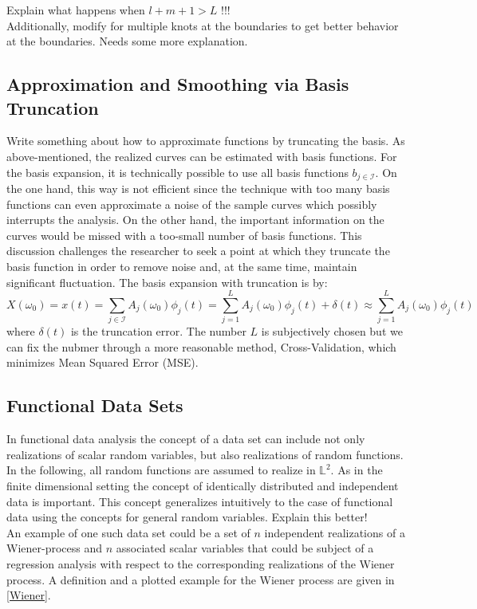 \documentclass[11pt,twoside,a4paper]{article}
\begin{document}
	{\color{red}Explain what happens when $l+m+1 > L$ !!!\\
		Additionally, modify for multiple knots at the boundaries to get better behavior at the boundaries. Needs some more explanation.}	
	
	\subsection{Approximation and Smoothing via Basis Truncation}
	{\color{red} Write something about how to approximate functions by truncating the basis.}
	As above-mentioned, the realized curves can be estimated with basis functions. For the basis expansion, it is technically possible to use all basis functions $b_{j \in \mathcal{I}}$. On the one hand, this way is not efficient since the technique with too many basis functions can even approximate a noise of the sample curves which possibly interrupts the analysis. On the other hand, the important information on the curves would be missed with a too-small number of basis functions. This discussion challenges the researcher to seek a point at which they truncate the basis function in order to remove noise and, at the same time, maintain significant fluctuation. The basis expansion with truncation is by:
	\begin{equation}
		X(\omega_0) = x(t) = \sum_{j \in \mathcal{I}} A_j(\omega_0) \phi_j(t) = \sum_{j = 1}^{L} A_j(\omega_0) \phi_j(t) + \delta(t) \approx \sum_{j = 1}^{L} A_j(\omega_0) \phi_j(t)
	\end{equation}
	where $\delta(t)$ is the truncation error. The number $L$ is subjectively chosen but we can fix the nubmer through a more reasonable method, Cross-Validation, which minimizes Mean Squared Error (MSE). 
	
	\subsection{Functional Data Sets}
	In functional data analysis the concept of a data set can include not only realizations of scalar random variables, but also realizations of random functions. In the following, all random functions are assumed to realize in $\mathbb{L}^2$. As in the finite dimensional setting the concept of identically distributed and independent data is important. This concept generalizes intuitively to the case of functional data using the concepts for general random variables. {\color{red} Explain this better!}\\
	An example of one such data set could be a set of $n$ independent realizations of a Wiener-process and $n$ associated scalar variables that could be subject of a regression analysis with respect to the corresponding realizations of the Wiener process. A definition and a plotted example for the Wiener process are given in \ref{Wiener}.
	
\end{document}
